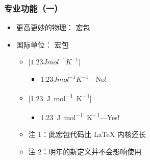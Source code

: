 \begin{frame}[fragile]
\frametitle{专业功能（一）}
\begin{itemize}
  \item 更高更妙的物理： 宏包
  \item 国际单位： 宏包
    \begin{itemize}
      \item |$1.23 J mol^{-1} K^{-1}$|
        \begin{itemize}
          \item $1.23 J mol^{-1} K^{-1}$---No!
        \end{itemize}
      \item |\SI{1.23}{J.mol^{-1}.K^{-1}}|
        \begin{itemize}
          \item \SI{1.23}{J.mol^{-1}.K^{-1}}---Yes!
        \end{itemize}
      \item 注 1：此宏包代码比 \LaTeX{} 内核还长
      \item 注 2：明年的新定义并不会影响使用
    \end{itemize}
\end{itemize}
\end{frame}

